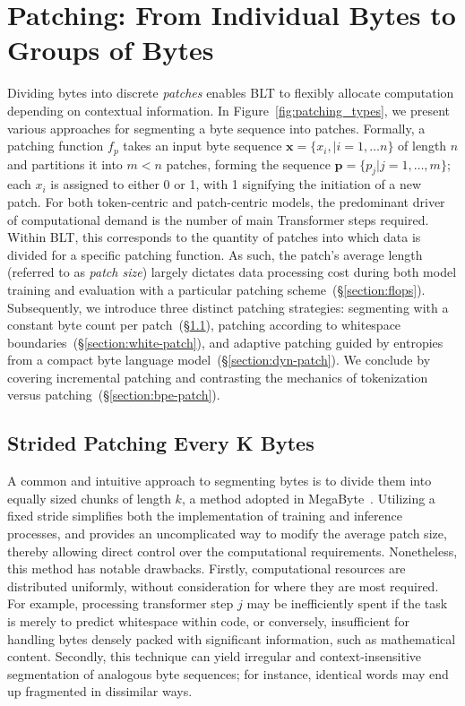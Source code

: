 \section{Patching: From Individual Bytes to Groups of Bytes}
\label{section:patching}

Dividing bytes into discrete \textit{patches} enables {\textsc BLT} to flexibly allocate computation depending on contextual information. In Figure~\ref{fig:patching_types}, we present various approaches for segmenting a byte sequence into patches. Formally, a patching function $f_p$ takes an input byte sequence $\pmb{x}=\{x_i,|i=1,\ldots n\}$ of length $n$ and partitions it into $m < n$ patches, forming the sequence $\pmb{p}=\{p_j|j=1,\ldots,m\}$; each $x_i$ is assigned to either 0 or 1, with 1 signifying the initiation of a new patch. For both token-centric and patch-centric models, the predominant driver of computational demand is the number of main Transformer steps required. Within {\textsc BLT}, this corresponds to the quantity of patches into which data is divided for a specific patching function. As such, the patch's average length (referred to as \textit{patch size}) largely dictates data processing cost during both model training and evaluation with a particular patching scheme~(\S\ref{section:flops}).
Subsequently, we introduce three distinct patching strategies: segmenting with a constant byte count per patch~(\S\ref{section:static-patch}), patching according to whitespace boundaries~(\S\ref{section:white-patch}), and adaptive patching guided by entropies from a compact byte language model~(\S\ref{section:dyn-patch}). We conclude by covering incremental patching and contrasting the mechanics of tokenization versus patching~(\S\ref{section:bpe-patch}).

\subsection{Strided Patching Every K Bytes}
\label{section:static-patch}

A common and intuitive approach to segmenting bytes is to divide them into equally sized chunks of length $k$, a method adopted in MegaByte~\citep{yu2023megabyte}. Utilizing a fixed stride simplifies both the implementation of training and inference processes, and provides an uncomplicated way to modify the average patch size, thereby allowing direct control over the computational requirements. Nonetheless, this method has notable drawbacks. Firstly, computational resources are distributed uniformly, without consideration for where they are most required. For example, processing transformer step $j$ may be inefficiently spent if the task is merely to predict whitespace within code, or conversely, insufficient for handling bytes densely packed with significant information, such as mathematical content. Secondly, this technique can yield irregular and context-insensitive segmentation of analogous byte sequences; for instance, identical words may end up fragmented in dissimilar ways.

